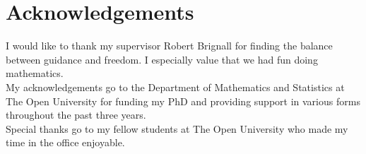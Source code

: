 \section*{Acknowledgements}

I would like to thank my supervisor Robert Brignall for finding the balance between guidance and freedom. I especially value that we had fun doing mathematics.\\

My acknowledgements go to the Department of Mathematics and Statistics at The Open University for funding my PhD and providing support in various forms throughout the past three years.\\

Special thanks go to my fellow students at The Open University who made my time in the office enjoyable.
